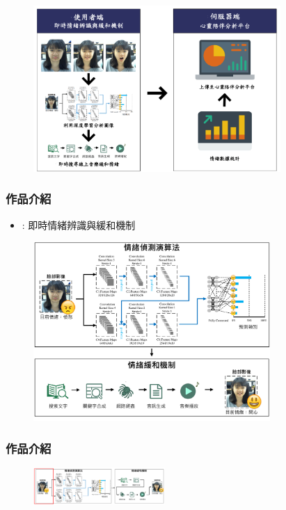 \documentclass[10pt, conference, compsocconf]{beamer}
\begin{document}
\begin{CJK}{UTF8}{}
\begin{frame}
\begin{figure}[!t]
\begin{center}
\includegraphics[width=9.4cm]{./Figures/UserAndServer.pdf}
\end{center}
\end{figure}

\end{frame}

\begin{frame}
\frametitle{作品介紹}
\begin{itemize}
\item {} : 即時情緒辨識與緩和機制
\end{itemize}

\begin{figure}[!t]
\begin{center}
\includegraphics[width=9cm]{./Figures/framework_vertical.pdf}
\end{center}
\end{figure}

\end{frame}

\begin{frame}
\frametitle{作品介紹}
\begin{figure}[t]
\begin{flushright}
\includegraphics[width=5cm]{./Figures/framework1.pdf}
\end{flushright}
\end{figure}


\end{frame}
\end{CJK}
\end{document}
